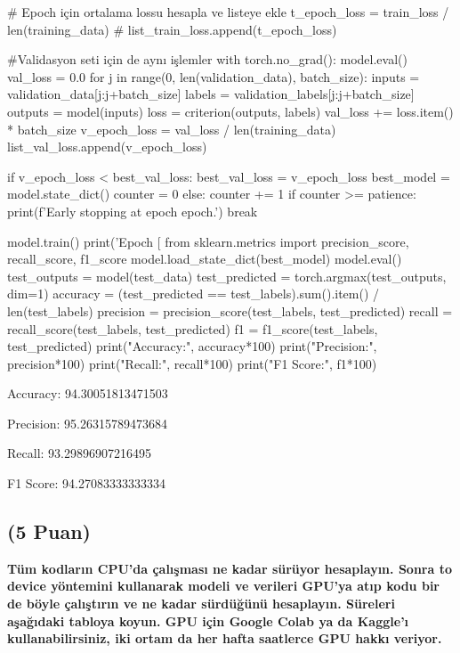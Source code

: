 \documentclass[11pt]{article}
\begin{document}
\begin{python}
    # Epoch için ortalama lossu hesapla ve listeye ekle 
    t_epoch_loss = train_loss / len(training_data) #
    list_train_loss.append(t_epoch_loss)
    
#Validasyon seti için de aynı işlemler
    with torch.no_grad():
        model.eval()
        val_loss = 0.0
        for j in range(0, len(validation_data), batch_size):
            inputs = validation_data[j:j+batch_size]
            labels = validation_labels[j:j+batch_size]
            outputs = model(inputs)
            loss = criterion(outputs, labels)
            val_loss += loss.item() * batch_size
        v_epoch_loss = val_loss / len(training_data)
        list_val_loss.append(v_epoch_loss)
    
        if v_epoch_loss < best_val_loss:
            best_val_loss = v_epoch_loss
            best_model = model.state_dict()
            counter = 0
        else:
            counter += 1
            if counter >= patience:
                print(f'Early stopping at epoch {epoch}.')
                break
          
            


    model.train()
    print('Epoch [%
from sklearn.metrics import precision_score, recall_score, f1_score
model.load_state_dict(best_model)
model.eval()
test_outputs = model(test_data)
test_predicted = torch.argmax(test_outputs, dim=1)
accuracy = (test_predicted == test_labels).sum().item() / len(test_labels)
precision = precision_score(test_labels, test_predicted)
recall = recall_score(test_labels, test_predicted)
f1 = f1_score(test_labels, test_predicted)
print("Accuracy:", accuracy*100)
print("Precision:", precision*100)
print("Recall:", recall*100)
print("F1 Score:", f1*100)
\end{python}
Accuracy: 94.30051813471503

Precision: 95.26315789473684

Recall: 93.29896907216495

F1 Score: 94.27083333333334

\subsection{(5 Puan)} \textbf{Tüm kodların CPU'da çalışması ne kadar sürüyor hesaplayın. Sonra to device yöntemini kullanarak modeli ve verileri GPU'ya atıp kodu bir de böyle çalıştırın ve ne kadar sürdüğünü hesaplayın. Süreleri aşağıdaki tabloya koyun. GPU için Google Colab ya da Kaggle'ı kullanabilirsiniz, iki ortam da her hafta saatlerce GPU hakkı veriyor.}
\end{document}
